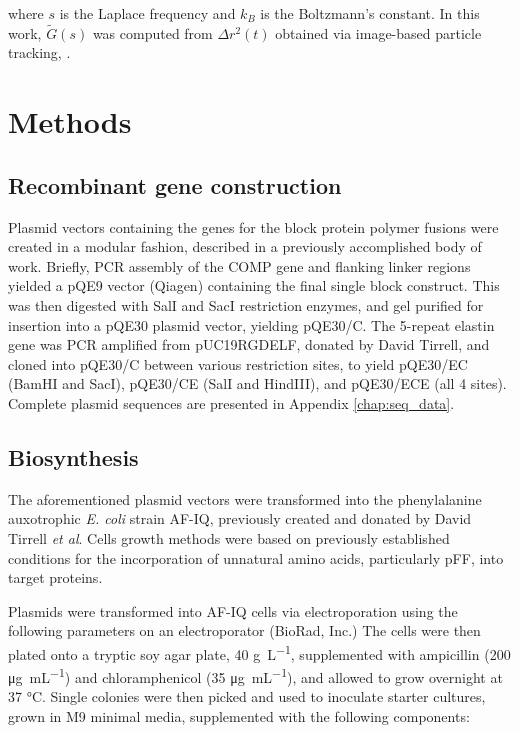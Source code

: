 \begin{refsection}
where ${s}$ is the Laplace frequency and ${k_B}$ is the Boltzmann's constant. In
this work, ${\tilde{G}(s)}$ was computed from ${\Delta r^2(t)}$ obtained via
image-based particle tracking, .

\section{Methods}

\subsection{Recombinant gene construction}

Plasmid vectors containing the genes for the block protein polymer fusions were
created in a modular fashion, described in a previously accomplished body of
work.\cite{Haghpanah2009} Briefly, PCR assembly of the COMP gene and
flanking linker regions yielded a pQE9 vector (Qiagen) containing the final
single block construct. This was then digested with SalI and SacI restriction
enzymes, and gel purified for insertion into a pQE30 plasmid vector, yielding
pQE30/C. The 5-repeat elastin gene was PCR amplified from pUC19RGDELF, donated
by David Tirrell, and cloned into pQE30/C between various restriction sites, to
yield pQE30/EC (BamHI and SacI), pQE30/CE (SalI and HindIII), and pQE30/ECE (all
4 sites). Complete plasmid sequences are presented in Appendix
\ref{chap:seq_data}. 

\subsection{Biosynthesis}

The aforementioned plasmid vectors were transformed into the phenylalanine
auxotrophic \emph{E. coli} strain AF-IQ, previously created and donated by David
Tirrell \emph{et al}.\cite{Yoshikawa1994,Sharma2000} Cells growth methods were based on
previously established conditions for the incorporation of unnatural amino
acids, particularly pFF, into target
proteins.\cite{Voloshchuk2009,Yoshikawa1994}

Plasmids were transformed into AF-IQ cells via electroporation using the
following parameters on an electroporator (BioRad, Inc.) The cells were then
plated onto a tryptic soy agar plate, 40
\si{\g\per\L},
supplemented with ampicillin (200 
\si{\ug\per\mL})
and chloramphenicol (35
\si{\ug\per\mL}), and
allowed to grow overnight at 37 \si{\celsius}. Single colonies were then picked
and used to inoculate starter cultures, grown in M9 minimal media, supplemented
with the following components:


\end{refsection}
